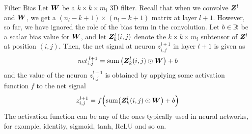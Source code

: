 %
%
%
%
%
\begin{frame}{Filter Bias}
Let ${\boldsymbol W}$ be a $k \times k \times m_l$ 3D filter.
Recall that when we convolve ${\boldsymbol Z}^l$ and ${\boldsymbol W}$, we get a $(n_l-k+1)
\times (n_l-k+1)$ matrix at layer $l+1$. 
However, so far, we have ignored the role of the bias term in the
convolution. Let $b \in {\mathord{\mathbb R}}$ be a scalar bias value for ${\boldsymbol W}$, and
let ${\boldsymbol Z}^l_k(i,j)$ denote the $k \times k \times m_l$ subtensor of
${\boldsymbol Z}^l$ at position $(i,j)$.
Then, the net signal at neuron
$z^{l+1}_{i,j}$ in layer $l+1$ is given as
\begin{align*}
    \mathit{net}^{\;l+1}_{i,j} = \operatorname*{sum}\left( {\boldsymbol Z}^l_k(i,j) \odot {\boldsymbol W} \right) +
    b
\end{align*}
and the value of the neuron $z^{l+1}_{i,j}$ is obtained by applying some
activation function $f$ to the net signal
\begin{align*}
    z^{l+1}_{i,j} = f\Bigl(\operatorname*{sum}\bigl( {\boldsymbol Z}^l_k(i,j) \odot {\boldsymbol W} \bigr) +
        b \Bigr)
\end{align*}
The activation function can be any of the ones typically used in neural
networks, for example, identity, sigmoid, tanh, ReLU and so on.
%
\end{frame}
%
%
%
%

